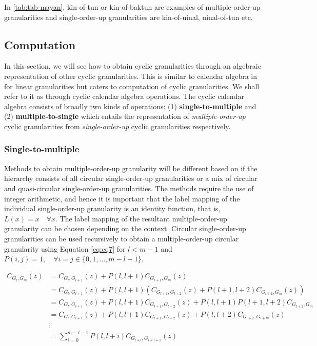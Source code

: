 \documentclass[12pt]{article}
\begin{document}
\begin{example}
{\rm In \autoref{tab:tab-mayan}, kin-of-tun or kin-of-baktun are examples of multiple-order-up granularities and single-order-up granularities are kin-of-uinal, uinal-of-tun etc.}
\end{example}

\hypertarget{computation-1}{%
\subsection{Computation}\label{computation-1}}

In this section, we will see how to obtain cyclic granularities through an algebraic representation of other cyclic granularities. This is similar to calendar algebra in \citet{Ning_2002} for linear granularities but caters to computation of cyclic granularities. We shall refer to it as through cyclic calendar algebra operations. The cyclic calendar algebra consists of broadly two kinds of operations:
(1) \textbf{single-to-multiple} and (2) \textbf{multiple-to-single} which entails the representation of \emph{multiple-order-up} cyclic granularities from \emph{single-order-up} cyclic granularities respectively.

\hypertarget{sec:single-to-multiple}{%
\subsubsection{Single-to-multiple}\label{sec:single-to-multiple}}

\noindent Methods to obtain multiple-order-up granularity will be different based on if the hierarchy consists of all circular single-order-up granularities or a mix of circular and quasi-circular single-order-up granularities. The methods require the use of integer arithmetic, and hence it is important that the label mapping of the individual single-order-up granularity is an identity function, that is, \(L(x) = x\quad \forall x\). The label mapping of the resultant multiple-order-up granularity can be chosen depending on the context. Circular single-order-up granularities can be used recursively to obtain a multiple-order-up circular granularity using Equation \ref{eq:eq7} for \(l < m - 1\) and \(P(i, j) = 1, \quad \forall i = j \in \{0, 1, \dots, m-l-1\}\).

\begin{equation} \label{eq:eq7}
\begin{split}
C_{G_l,G_m}(z) & = C_{G_l,G_{l+1}}(z) + P(l, l+1)C_{G_{l+1},G_m}(z)\\
  & = C_{G_l,G_{l+1}}(z) + P(l, l+1)( C_{G_{l+1},G_{l+2}}(z) + P(l+1, l+2)C_{G_{l+2}, G_m}(z)) \\
  & = C_{G_l,G_{l+1}}(z) + P(l, l+1)C_{G_{l+1},G_{l+2}}(z) + P(l, l+1)P(l+1, l+2)C_{G_{l+2}, G_{m}}\\
  & = C_{G_l,G_{l+1}}(z) + P(l, l+1)C_{G_{l+1},G_{l+2}}(z) + P(l, l+2)C_{G_{l+2},G_{l+m}}(z)\\
  &\vdots\\
  & = \sum_{i=0}^{m - l - 1} P(l, l+i)C_{G_{l+i},G_{l+i+1}}(z)\\
\end{split}
\end{equation}
\end{document}
